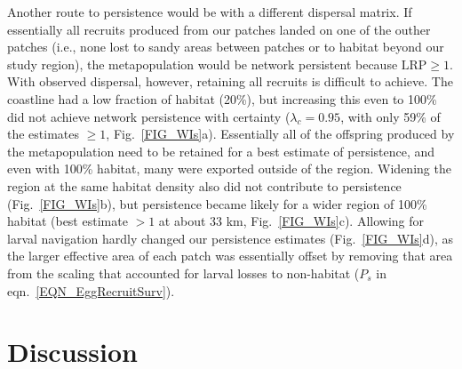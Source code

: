 \documentclass[12pt, oneside]{article}   	%
\begin{document}
Another route to persistence would be with a different dispersal matrix. If essentially all recruits produced from our patches landed on one of the outher patches (i.e., none lost to sandy areas between patches or to habitat beyond our study region), the metapopulation would be network persistent because $\text{LRP} \geq 1$. With observed dispersal, however, retaining all recruits is difficult to achieve. The coastline had a low fraction of habitat (20\%), but increasing this even to 100\% did not achieve network persistence with certainty ($\lambda_c = 0.95$, with only 59\% of the estimates $\geq 1$, Fig.\ \ref{FIG_WIs}a). Essentially all of the offspring produced by the metapopulation need to be retained for a best estimate of persistence, and even with 100\% habitat, many were exported outside of the region. Widening the region at the same habitat density also did not contribute to persistence (Fig.\ \ref{FIG_WIs}b), but persistence became likely for a wider region of 100\% habitat (best estimate $>1$ at about 33 km, Fig.\ \ref{FIG_WIs}c). Allowing for larval navigation hardly changed our persistence estimates (Fig.\ \ref{FIG_WIs}d), as the larger effective area of each patch was essentially offset by removing that area from the scaling that accounted for larval losses to non-habitat ($P_s$ in eqn.\ \ref{EQN_EggRecruitSurv}).



\section*{Discussion}
\end{document}
